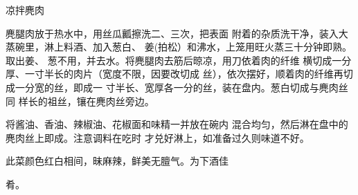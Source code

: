 \begin{recipe}{凉拌麂肉}

\ingredients


\cooking

\step 	麂腿肉放于热水中，用丝瓜瓤擦洗二、三次，把表面 附着的杂质洗干净，装入大蒸碗里，淋上料酒、加入葱白、 姜(拍松）和沸水，上笼用旺火蒸三十分钟即熟。取出姜、 葱不用，并去水。将麂腿肉去筋后晾凉，用刀依着肉的纤维 横切成一分厚、一寸半长的肉片（宽度不限，因要改切成 丝），依次摆好，顺着肉的纤维再切成一分宽的丝，即成一 寸半长、宽厚各一分的丝，装在盘内。葱白切成与麂肉丝同 样长的祖丝，镶在麂肉丝旁边。

\step 	将酱油、香油、辣椒油、花椒面和味精一并放在碗内 混合均匀，然后淋在盘中的麂肉丝上即成。注意调料在吃时 才兑好淋上，如准备过久则味道不好。

\notes

此菜颜色红白相间，昧麻辣，鲜美无膻气。为下酒佳

肴。

\end{recipe}

